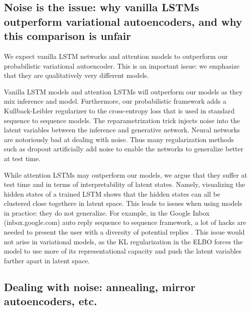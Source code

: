\subsection*{Noise is the issue: why vanilla LSTMs outperform variational autoencoders, and why this comparison is unfair}

We expect vanilla LSTM networks and attention models to outperform our probabilistic variational autoencoder. This is an important issue:  we emphasize that they are qualitatively very different models.

Vanilla LSTM models and attention LSTMs will outperform our models as they mix inference and model. Furthermore, our probabilistic framework adds a Kullback-Leibler regularizer to the cross-entropy loss that is used in standard sequence to sequence models. The reparametrization trick \citep{Kingma2014} injects noise into the latent variables between the inference and generative network. Neural networks are notoriously bad at dealing with noise. Thus many regularization methods such as dropout \citep{Hinton2014} artificially add noise to enable the networks to generalize better at test time.

While attention LSTMs may outperform our models, we argue that they suffer at test time and in terms of interpretability of latent states. Namely, visualizing the hidden states of a trained LSTM shows that the hidden states can all be clustered close togethere in latent space. This leads to issues when using models in practice: they do not generalize. For example, in the Google Inbox (inbox.google.com) auto reply sequence to sequence framework, a lot of hacks are needed to present the user with a diversity of potential replies \citep{Corrado}. This issue would not arise in variational models, as the KL regularization in the ELBO forces the model to use more of its representational capacity and push the latent variables farther apart in latent space.

\subsection*{Dealing with noise: annealing, mirror autoencoders, etc.}






